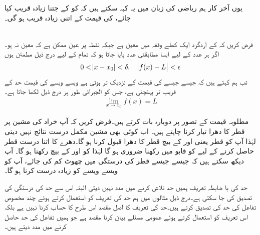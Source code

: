 یوں آخر کار ہم ریاضی کی زبان میں یہ کہہ سکتے ہیں کہ  کو  کے جتنا زیادہ قریب کیا جائے،  کی قیمت  کے اتنی زیادہ  قریب ہو گی۔

\\
فرض کریں کہ   کے اردگرد ایک کھلے وقفہ میں  معین ہے جبکہ نقطہ  پر عین ممکن ہے کہ  معین نہ ہو۔ اگر ہر عدد  کے لیے ایسا مطابقتی عدد  پایا جاتا ہو کہ تمام  کے لیے درج ذیل مطمئن ہوں  
\begin{align*}
0<\abs{x-x_0}<\delta,\quad \abs{f(x)-L}<\epsilon
\end{align*}
تب ہم کہتے ہیں کہ جیسے جیسے  کی قیمت  کے نزدیک تر ہوتی ہے  ویسے ویسے  کی قیمت حد   کے قریب تر  پہنچتی ہے،  جس کو الجبرائی طور پر درج ذیل لکھا جاتا ہے۔
\begin{align*}
\lim_{x\to x_0} f(x)=L
\end{align*} 

مطلوبہ قیمت کے تصور پر دوبارہ بات کرتے ہیں۔فرض کریں کہ آپ خراد کی مشین پر قطر  کا دھرا تیار کرنا چاہتے ہیں۔ اب کوئی بھی مشین مکمل درست نتائج نہیں دیتی   لہٰذا  آپ کو  قطر یعنی  اور  کے بیچ قطر کا دھرا قبول کرنا ہو گا۔دھرے  کا اتنا درست قطر حاصل کرنے کے لیے  کو قابو میں رکھنا ضروری ہو گا لہٰذا  کو  اور  کے بیچ رکھنا ہو گا۔ آپ دیکھ سکتے ہیں کہ جیسے جیسے قطر کی درستگی میں چھوٹ  کم کی جائے، آپ کو ویسے ویسے  کو  زیادہ درست کرنا ہو گا۔

حد کی با ضابطہ تعریف ہمیں حد تلاش کرنے میں مدد نہیں دیتی   البتہ اس سے حد کی درستگی کی تصدیق کی جا سکتی ہے۔درج ذیل مثالوں میں ہم حد کی تعریف کو استعمال کرتے ہوئے  چند مخصوص تفاعل کی حد کی تصدیق کرتے ہیں۔حد کی تعریف کا اصل مقصد اس طرح کا حساب کرنا  نہیں ہے   بلکہ اس تعریف کو استعمال کرتے ہوئے عمومی مسئلے بیان کرنا مقصد ہے جو ہمیں تفاعل کی حد حاصل کرنے میں مدد دیتے ہیں۔
 
